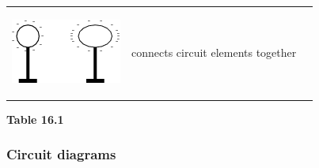 \begin{center}
\begin{xtabular*}{\mytablewidth}[t]{|p{10\mystarwidth}|p{10\mystarwidth}|p{10\mystarwidth}|}
                    
    \setcounter{subfigure}{0}

\label{m38771*id63163}
    \begin{center}
    \label{m38771*id63163!!!underscore!!!media}\label{m38771*id63163!!!underscore!!!printimage}\includegraphics{col11305.imgs/m38771_PG10C9_008.png} %
        
      \vspace{2pt}
    \vspace{.1in}
    
    \end{center}



    \addtocounter{footnote}{-0}
    
                   &
    
    
        connects circuit elements together%
     \tabularnewline{}
    \end{xtabular*}
      \end{center}
    \begin{center}{\small\bfseries Table 16.1}\end{center}
    
    \addtocounter{footnote}{-0}
    
    \par
  
        
        \label{m38771*uid13}
            \subsubsection{ Circuit diagrams}
            \nopagebreak
            
